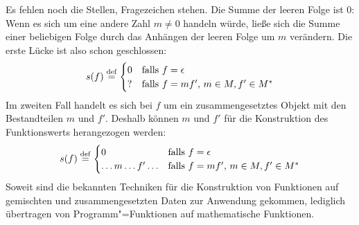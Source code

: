 Es fehlen noch die Stellen, Fragezeichen stehen.
Die Summe der leeren Folge ist $0$:  Wenn es sich um eine andere
Zahl $m \neq 0$ handeln würde, ließe sich die Summe einer
beliebigen Folge durch das Anhängen der leeren Folge um $m$ verändern.
Die erste Lücke ist also schon geschlossen:
%
\begin{displaymath}
  s(f) \stackrel{\rm def}{=}
  \begin{cases}
    0 & \textrm{falls $f = \epsilon$}\\
    ? & \textrm{falls $f = mf'$, $m\in M, f'\in M^\ast$}
  \end{cases}
\end{displaymath}
%
Im zweiten Fall handelt es sich bei $f$ um ein
zusammengesetztes Objekt mit den Bestandteilen $m$ und $f'$.
Deshalb können $m$ und $f'$ für die Konstruktion des Funktionswerts
herangezogen werden:
%
\begin{displaymath}
  s(f) \stackrel{\rm def}{=}
  \begin{cases}
    0 & \textrm{falls $f = \epsilon$}\\
    \ldots m \ldots f' \ldots & \textrm{falls $f = mf'$, $m\in M, f'\in M^\ast$}
  \end{cases}
\end{displaymath}
%
Soweit sind die bekannten Techniken für die Konstruktion von
Funktionen auf gemischten und zusammengesetzten Daten zur Anwendung
gekommen, lediglich übertragen von Programm"=Funktionen auf
mathematische Funktionen.

